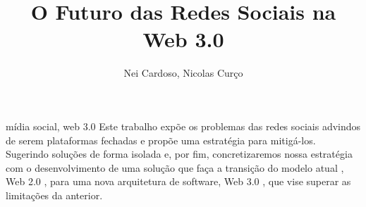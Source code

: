 \documentclass[portuguese,oneside]{tcc}
\author{Nei Cardoso, Nicolas Curço}
\title{O Futuro das Redes Sociais na Web 3.0}
      {The Future of Social Media in the Web 3.0}
\begin{document}







\begin{resumo}{mídia social, web 3.0}
Este trabalho expõe os problemas das redes sociais advindos de serem plataformas fechadas e propõe uma estratégia para mitigá-los.
Sugerindo soluções de forma isolada e, por fim, concretizaremos nossa estratégia com o desenvolvimento de uma solução que faça a transição do modelo atual , Web 2.0 , para  uma nova arquitetura de software, Web 3.0 , que vise superar as limitações da anterior.
\end{resumo}
\end{document}
